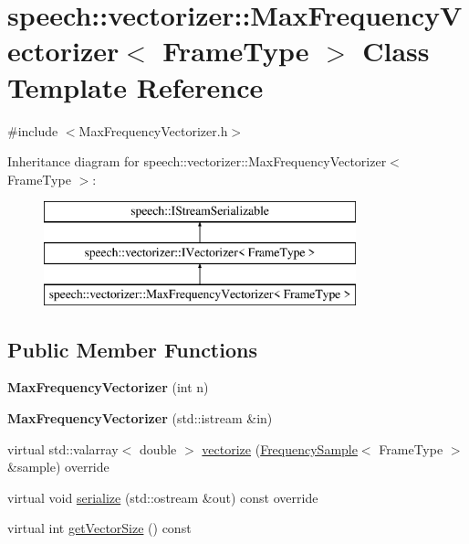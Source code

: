 \hypertarget{classspeech_1_1vectorizer_1_1MaxFrequencyVectorizer}{\section{speech\+:\+:vectorizer\+:\+:Max\+Frequency\+Vectorizer$<$ Frame\+Type $>$ Class Template Reference}
\label{classspeech_1_1vectorizer_1_1MaxFrequencyVectorizer}
}


{\ttfamily \#include $<$Max\+Frequency\+Vectorizer.\+h$>$}

Inheritance diagram for speech\+:\+:vectorizer\+:\+:Max\+Frequency\+Vectorizer$<$ Frame\+Type $>$\+:\begin{figure}[H]
\begin{center}
\leavevmode
\includegraphics[height=3.000000cm]{classspeech_1_1vectorizer_1_1MaxFrequencyVectorizer}
\end{center}
\end{figure}
\subsection*{Public Member Functions}
\begin{DoxyCompactItemize}
\item 
\hypertarget{classspeech_1_1vectorizer_1_1MaxFrequencyVectorizer_a5f2209fb1be3ddfa5786678154156b83}{{\bfseries Max\+Frequency\+Vectorizer} (int n)}\label{classspeech_1_1vectorizer_1_1MaxFrequencyVectorizer_a5f2209fb1be3ddfa5786678154156b83}

\item 
\hypertarget{classspeech_1_1vectorizer_1_1MaxFrequencyVectorizer_a516e583601993b370f6a65b0adc4603f}{{\bfseries Max\+Frequency\+Vectorizer} (std\+::istream \&in)}\label{classspeech_1_1vectorizer_1_1MaxFrequencyVectorizer_a516e583601993b370f6a65b0adc4603f}

\item 
virtual std\+::valarray$<$ double $>$ \hyperlink{classspeech_1_1vectorizer_1_1MaxFrequencyVectorizer_a9463cc7d335fdc5d181d2dffbd488a12}{vectorize} (\hyperlink{classspeech_1_1raw__data_1_1FrequencySample}{Frequency\+Sample}$<$ Frame\+Type $>$ \&sample) override
\item 
virtual void \hyperlink{classspeech_1_1vectorizer_1_1MaxFrequencyVectorizer_a1fdb7b7544a6386e64e8df49b644a13c}{serialize} (std\+::ostream \&out) const override
\item 
virtual int \hyperlink{classspeech_1_1vectorizer_1_1MaxFrequencyVectorizer_af92f2750d71a14cbc74d8508f8dbb354}{get\+Vector\+Size} () const 
\end{DoxyCompactItemize}

